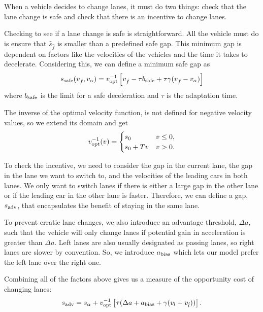 \documentclass[12pt]{article}
\begin{document}
      When a vehicle decides to change lanes, it must do two things: check that the lane change is safe and check that there is an incentive to change lanes.

      Checking to see if a lane change is safe is straightforward. All the vehicle must do is ensure that $\hat s_{\hat f}$ is smaller than a predefined safe gap. This minimum gap is dependent on factors like the velocities of the vehicles and the time it takes to decelerate. 
      Considering this, we can define a minimum safe gap as 
      \begin{equation}
        s_{\rm safe} (v_{\hat f}, v_{\alpha}) = v_{\rm opt}^{-1} \left[v_{\hat f} -\tau b_{\rm safe} + \tau \gamma (v_{\hat f} - v_{\alpha}) \right]
      \end{equation}
      where $b_{\rm safe}$ is the limit for a safe deceleration and $\tau$ is the adaptation time. 

      The inverse of the optimal velocity function, is not defined for negative velocity values, so we extend its domain and get
      \begin{equation}
        v_{\rm opt}^{-1}(v) = \begin{cases}
          s_0 & v \leq 0,\\
          s_0 + Tv & v > 0.\\
        \end{cases}
      \end{equation}

      To check the incentive, we need to consider the gap in the current lane, the gap in the lane we want to switch to, and the velocities of the leading cars in both lanes. We only want to switch lanes if there is either a large gap in the other lane or if the leading car in the other lane is faster. Therefore, we can define a gap, $s_{\rm adv}$, that encapsulates the benefit of staying in the same lane. 
      
      To prevent erratic lane changes, we also introduce an advantage threshold, $\Delta a$, such that the vehicle will only change lanes if potential gain in acceleration is greater than $\Delta a$.  Left lanes are also usually designated as passing lanes, so right lanes are slower by convention. So, we introduce $a_{\rm bias}$ which lets our model prefer the left lane over the right one. 
      
      Combining all of the factors above gives us a measure of the opportunity cost of changing lanes:
      \begin{equation}
        s_{\rm adv} = s_{\alpha} + v_{\rm opt}^{-1} \left[\tau(\Delta a + a_{\rm bias} + \gamma(v_l - v_{\hat l}))\right].
      \end{equation}
\end{document}
